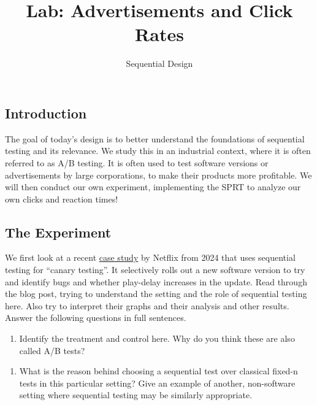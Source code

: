 \documentclass[
  letterpaper,
  DIV=11,
  numbers=noendperiod]{scrartcl}
\title{Lab: Advertisements and Click Rates}
\subtitle{Sequential Design}
\author{}
\date{}
\providecommand{\tightlist}{%
  \setlength{\itemsep}{0pt}\setlength{\parskip}{0pt}}
\begin{document}
\maketitle


\subsection{Introduction}\label{introduction}

The goal of today's design is to better understand the foundations of
sequential testing and its relevance. We study this in an industrial
context, where it is often referred to as A/B testing. It is often used
to test software versions or advertisements by large corporations, to
make their products more profitable. We will then conduct our own
experiment, implementing the SPRT to analyze our own clicks and reaction
times!\\

\subsection{The Experiment}\label{the-experiment}

We first look at a recent
\href{https://netflixtechblog.com/sequential-a-b-testing-keeps-the-world-streaming-netflix-part-1-continuous-data-cba6c7ed49df}{case
study} by Netflix from 2024 that uses sequential testing for ``canary
testing''. It selectively rolls out a new software version to try and
identify bugs and whether play-delay increases in the update. Read
through the blog post, trying to understand the setting and the role of
sequential testing here. Also try to interpret their graphs and their
analysis and other results.\\

Answer the following questions in full sentences.

\begin{enumerate}
\def\labelenumi{\arabic{enumi}.}
\tightlist
\item
  Identify the treatment and control here. Why do you think these are
  also called A/B tests?
\end{enumerate}

\hfill\break
\hfill\break
\hfill\break
\hfill\break

\begin{enumerate}
\def\labelenumi{\arabic{enumi}.}
\setcounter{enumi}{1}
\tightlist
\item
  What is the reason behind choosing a sequential test over classical
  fixed-n tests in this particular setting? Give an example of another,
  non-software setting where sequential testing may be similarly
  appropriate.
\end{enumerate}
\end{document}
